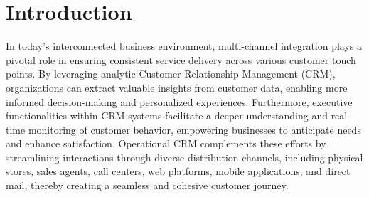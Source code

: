 \section{Introduction}

In today's interconnected business environment, multi-channel integration plays a pivotal role in ensuring consistent service delivery across various customer touch points. 
By leveraging analytic Customer Relationship Management (CRM), organizations can extract valuable insights from customer data, enabling more informed decision-making and personalized experiences. 
Furthermore, executive functionalities within CRM systems facilitate a deeper understanding and real-time monitoring of customer behavior, empowering businesses to anticipate needs and enhance satisfaction. 
Operational CRM complements these efforts by streamlining interactions through diverse distribution channels, including physical stores, sales agents, call centers, web platforms, mobile applications, and direct mail, thereby creating a seamless and cohesive customer journey.